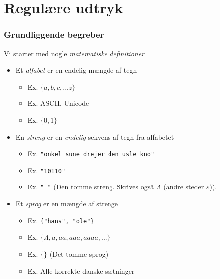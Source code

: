 \documentclass[]{beamer}
\begin{document}
\section{Regulære udtryk}
\begin{frame}
\frametitle{Grundliggende begreber}
Vi starter med nogle \emph{matematiske definitioner}
\begin{itemize}[<+->]
\item Et \emph{alfabet} er en endelig mængde af tegn
\begin{itemize}
    \item Ex. $\{a,b,c,...z\}$
    \item Ex. ASCII, Unicode
    \item Ex. $\{0, 1\}$
\end{itemize}
\item En \emph{streng} er en \emph{endelig} sekvens af tegn fra alfabetet
\begin{itemize}
    \item Ex. \texttt{"onkel sune drejer den usle kno"}
    \item Ex. \texttt{"10110"}
    \item Ex. \texttt{"\,"}  (Den tomme streng. Skrives også $\Lambda$ (andre steder $\varepsilon$)).
\end{itemize}
\item Et \emph{sprog} er en mængde af strenge
\begin{itemize}
\item Ex. \texttt{\{"hans", "ole"\}}
\item Ex. $\{\Lambda, a, aa, aaa, aaaa, ...\}$
\item Ex. $\{\}$ (Det tomme sprog)
\item Ex. Alle korrekte danske sætninger
\end{itemize}
\end{itemize}
\end{frame}
\end{document}
